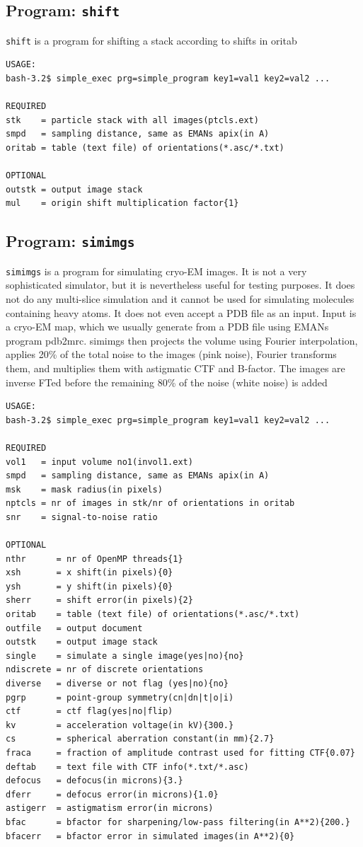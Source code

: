 \documentclass[a4paper,11pt]{article}
\newcommand{\prgname}[1]{\textcolor{NavyBlue}{\texttt{#1}}}
\begin{document}
\subsection{Program: \prgname{shift}}
\label{shift}
\prgname{shift} is a program for shifting a stack according to shifts in oritab

\begin{verbatim}
USAGE:
bash-3.2$ simple_exec prg=simple_program key1=val1 key2=val2 ...

REQUIRED
stk    = particle stack with all images(ptcls.ext)
smpd   = sampling distance, same as EMANs apix(in A)
oritab = table (text file) of orientations(*.asc/*.txt)

OPTIONAL
outstk = output image stack
mul    = origin shift multiplication factor{1}
\end{verbatim}

\subsection{Program: \prgname{simimgs}}
\label{simimgs}
\prgname{simimgs} is a program for simulating cryo-EM images. It is not a very sophisticated simulator, but it is nevertheless useful for testing purposes. It does not do any multi-slice simulation and it cannot be used for simulating molecules containing heavy atoms. It does not even accept a PDB file as an input. Input is a cryo-EM map, which we usually generate from a PDB file using EMANs program pdb2mrc. simimgs then projects the volume using Fourier interpolation, applies 20\% of the total noise to the images (pink noise), Fourier transforms them, and multiplies them with astigmatic CTF and B-factor. The images are inverse FTed before the remaining 80\% of the noise (white noise) is added

\begin{verbatim}
USAGE:
bash-3.2$ simple_exec prg=simple_program key1=val1 key2=val2 ...

REQUIRED
vol1   = input volume no1(invol1.ext)
smpd   = sampling distance, same as EMANs apix(in A)
msk    = mask radius(in pixels)
nptcls = nr of images in stk/nr of orientations in oritab
snr    = signal-to-noise ratio

OPTIONAL
nthr      = nr of OpenMP threads{1}
xsh       = x shift(in pixels){0}
ysh       = y shift(in pixels){0}
sherr     = shift error(in pixels){2}
oritab    = table (text file) of orientations(*.asc/*.txt)
outfile   = output document
outstk    = output image stack
single    = simulate a single image(yes|no){no}
ndiscrete = nr of discrete orientations
diverse   = diverse or not flag (yes|no){no}
pgrp      = point-group symmetry(cn|dn|t|o|i)
ctf       = ctf flag(yes|no|flip)
kv        = acceleration voltage(in kV){300.}
cs        = spherical aberration constant(in mm){2.7}
fraca     = fraction of amplitude contrast used for fitting CTF{0.07}
deftab    = text file with CTF info(*.txt/*.asc)
defocus   = defocus(in microns){3.}
dferr     = defocus error(in microns){1.0}
astigerr  = astigmatism error(in microns)
bfac      = bfactor for sharpening/low-pass filtering(in A**2){200.}
bfacerr   = bfactor error in simulated images(in A**2){0}
\end{verbatim}
\end{document}
